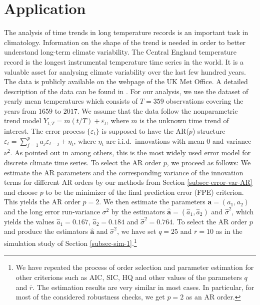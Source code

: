 \section{Application}\label{sec-data}


The analysis of time trends in long temperature records is an important task in climatology. Information on the shape of the trend is needed in order to better understand long-term climate variability. The Central England temperature record is the longest instrumental temperature time series in the world. It is a valuable asset for analysing climate variability over the last few hundred years. The data is publicly available on the webpage of the UK Met Office. A detailed description of the data can be found in \cite{Parker1992}. For our analysis, we use the dataset of yearly mean temperatures which consists of $T=359$ observations covering the years from $1659$ to $2017$. We assume that the data follow the nonparametric trend model $Y_{t,T} = m(t/T) + \varepsilon_t$, where $m$ is the unknown time trend of interest. The error process $\{ \varepsilon_t \}$ is supposed to have the AR($p$) structure $\varepsilon_t = \sum_{j=1}^p a_j \varepsilon_{t-j} + \eta_t$, where $\eta_t$ are i.i.d.\ innovations with mean $0$ and variance $\nu^2$. As pointed out in \cite{Mudelsee2010} among others, this is the most widely used error model for discrete climate time series. To select the AR order $p$, we proceed as follows: We estimate the AR parameters and the corresponding variance of the innovation terms for different AR orders by our methods from Section \ref{subsec-error-var-AR} and choose $p$ to be the minimizer of the final prediction error (FPE) criterion. This yields the AR order $p = 2$. We then estimate the parameters $\boldsymbol{a} = (a_1,a_2)$ and the long error run-variance $\sigma^2$ by the estimators $\widehat{\boldsymbol{a}} = (\widehat{a}_1,\widehat{a}_2)$ and $\widehat{\sigma}^2$, which yields the values  $\widehat{a}_1 = 0.167$, $\widehat{a}_2 = 0.184$ and $\widehat{\sigma}^2 = 0.764$. To select the AR order $p$ and produce the estimators $\widehat{\boldsymbol{a}}$ and $\widehat{\sigma}^2$, we have set $q = 25$ and $\overline{r} = 10$ as in the simulation study of Section \ref{subsec-sim-1}.\footnote{We have repeated the process of order selection and parameter estimation for other criterions such as AIC, SIC, HQ and other values of the parameters $q$ and $\overline{r}$. The estimation results are very similar in most cases. In particular, for most of the considered robustness checks, we get $p=2$ as an AR order.} 


